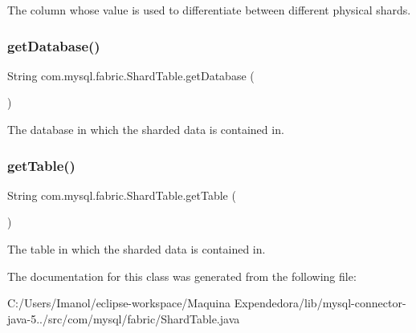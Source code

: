 The column whose value is used to differentiate between different physical shards. \mbox{\label{classcom_1_1mysql_1_1fabric_1_1_shard_table_ae105c3d6f617c81a53da057f013088ad}} 
\subsubsection{\texorpdfstring{get\+Database()}{getDatabase()}}
{\footnotesize\ttfamily String com.\+mysql.\+fabric.\+Shard\+Table.\+get\+Database (\begin{DoxyParamCaption}{ }\end{DoxyParamCaption})}

The database in which the sharded data is contained in. \mbox{\label{classcom_1_1mysql_1_1fabric_1_1_shard_table_aff4dc70c77c2d461ebd7609937423402}} 
\subsubsection{\texorpdfstring{get\+Table()}{getTable()}}
{\footnotesize\ttfamily String com.\+mysql.\+fabric.\+Shard\+Table.\+get\+Table (\begin{DoxyParamCaption}{ }\end{DoxyParamCaption})}

The table in which the sharded data is contained in. 

The documentation for this class was generated from the following file\+:\begin{DoxyCompactItemize}
\item 
C\+:/\+Users/\+Imanol/eclipse-\/workspace/\+Maquina Expendedora/lib/mysql-\/connector-\/java-\/5../src/com/mysql/fabric/Shard\+Table.\+java\end{DoxyCompactItemize}
